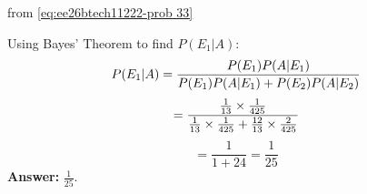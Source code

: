 \begin{enumerate}[label=\thesubsection.\arabic*, ref=\thesubsection.\theenumi]
from \eqref{eq:ee26btech11222-prob 33}

Using Bayes' Theorem to find $P(E_1 | A)$:
$$
P(E_1 | A) = \frac{P(E_1)P(A | E_1)}{P(E_1)P(A | E_1) + P(E_2)P(A | E_2)} \\$$
$$= \frac{\frac{1}{13} \times \frac{1}{425}}{\frac{1}{13} \times \frac{1}{425} + \frac{12}{13} \times \frac{2}{425}} \\$$
$$= \frac{1}{1 + 24} = \frac{1}{25}
$$
\textbf{Answer:} $\frac{1}{25}$.






\end{enumerate}


